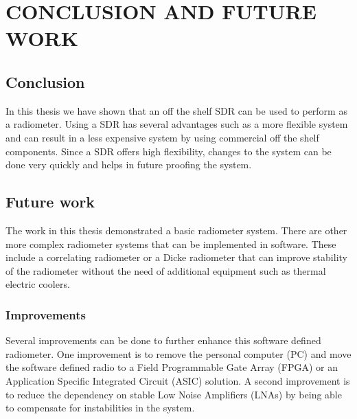 
\chapter{CONCLUSION AND FUTURE WORK} \label{ch:conclusion}

\section{Conclusion}
In this thesis we have shown that an off the shelf SDR can be used to perform as a radiometer.  Using a SDR has several advantages such as a more flexible system and can result in a less expensive system by using commercial off the shelf components.  Since a SDR offers high flexibility, changes to the system can be done very quickly and helps in future proofing the system.

\section{Future work}\label{Futurework}

The work in this thesis demonstrated a basic radiometer system.  There are other more complex radiometer systems that can be implemented in software. These include a correlating radiometer or a Dicke radiometer that can improve stability of the radiometer without the need of additional equipment such as thermal electric coolers.   


\subsection{Improvements}
Several improvements can be done to further enhance this software defined radiometer.  One improvement is to remove the personal computer (PC) and move the software defined radio to a Field Programmable Gate Array (FPGA) or an Application Specific Integrated Circuit (ASIC) solution.  A second improvement is to reduce the dependency on stable Low Noise Amplifiers (LNAs) by being able to compensate for instabilities in the system.  

